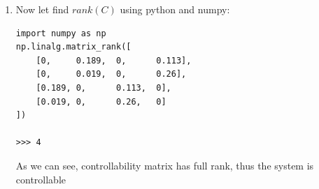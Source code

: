 \documentclass[12pt,letterpaper]{article}
\begin{document}
\begin{enumerate}
\begin{equation*}
\begin{matrix}
                0 & 0 & 0 & 13.68
            \end{matrix}\right)
            \left(\begin{matrix}
                0 \\
                0 \\
                0.189 \\
                0.019
            \end{matrix}\right)
            =
            \left(\begin{matrix}
                0 \\
                0 \\
                0.113 \\
                0.26
            \end{matrix}\right)
        \end{equation*}
        \begin{equation*}
            A^3B =
            \left(\begin{matrix}
                0 & 0 & 0 & 5.923 \\
                0 & 0 & 0 & 13.68 \\
                0 & 81.027 & 0 & 0 \\
                0 & 187.142 & 0 & 0
            \end{matrix}\right)
            \left(\begin{matrix}
                0 \\
                0 \\
                0.189 \\
                0.019
            \end{matrix}\right)
            =
            \left(\begin{matrix}
                0.113 \\
                0.26 \\
                0 \\
                0
            \end{matrix}\right)
        \end{equation*}
        \begin{equation*}
            C = \begin{bmatrix}
            0 & 0.189   & 0 & 0.113\\ 
            0 & 0.019   & 0 & 0.26\\ 
            0.189 & 0   & 0.113 & 0\\ 
            0.019 & 0   & 0.26 & 0
        \end{bmatrix}
        \end{equation*}
    \item Now let find $rank(C)$ using python and numpy:
    \begin{verbatim}
import numpy as np
np.linalg.matrix_rank([
    [0,     0.189,  0,      0.113], 
    [0,     0.019,  0,      0.26],
    [0.189, 0,      0.113,  0],
    [0.019, 0,      0.26,   0]
])

>>> 4
    \end{verbatim}
    As we can see, controllability matrix has full rank, thus the system is controllable
    \end{enumerate}
\end{document}
